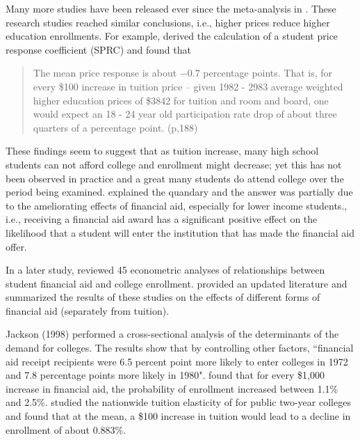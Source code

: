 \documentclass[12pt,english]{report}
\begin{document}
Many more studies have been released ever since the meta-analysis in
\citep{Leslie1987}. These research studies reached similar conclusions, i.e.,
higher prices reduce higher education enrollments.  For
example,\citet{Leslie1987} derived the calculation of a student price response
coefficient (SPRC) and found that
\begin{quote} 
The mean price response is about $-0.7$ percentage points. That is, for every
\$100 increase in tuition price -- given 1982 - 2983 average weighted higher
education prices of \$3842 for tuition and room and board, one would expect an
18 - 24 year old participation rate drop of about three quarters of a
percentage point. (p,188)
\end{quote} 

These findings seem to suggest that as tuition increase, many high school
students can not afford college and enrollment might decrease; yet this has not
been observed in practice and a great many students do attend college over the
period being examined. \citet{Leslie1987} explained the quandary and the answer
was partially due to the ameliorating effects of financial aid, especially for
lower income students., i.e., receiving a financial aid award has a significant
positive effect on the likelihood that a student will enter the institution
that has made the financial aid offer.

In a later study, \citet{Leslie1988} reviewed 45 econometric analyses of
relationships between student financial aid and college enrollment.
\citet{Heller1997} provided an updated literature and summarized the results of
these studies on the effects of different forms of financial aid (separately
from tuition).

Jackson (1998) performed a cross-sectional analysis of the determinants of the
demand for colleges.  The results show that by controlling other factors,
``financial aid receipt recipients were 6.5 percent point more likely to enter
colleges in 1972 and 7.8 percentage points more likely in 1980".
\citet{Braunstein1999} found that for every \$1,000 increase in financial
aid, the probability of  enrollment increased between 1.1\% and 2.5\%.
\citet{Crouse2015} studied the nationwide tuition elasticity of for public
two-year colleges and found that at the mean, a \$100 increase in tuition would
lead to a decline in enrollment of about 0.883\%.


\end{document}
